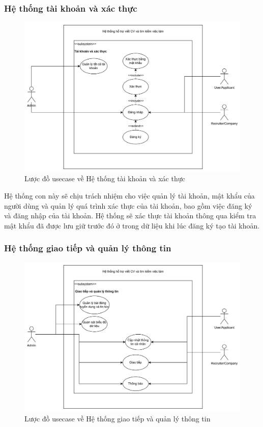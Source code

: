 \subsubsection{Hệ thống tài khoản và xác thực}

\begin{figure}[H]
	\centering
    \includegraphics[scale=0.1]{img/AccountAuthenticationUsecase.png}
    \caption{Lược đồ usecase về Hệ thống tài khoản và xác thực}
\end{figure}

Hệ thống con này sẽ chịu trách nhiệm cho việc quản lý tài khoản, mật khẩu của người dùng và quản lý quá trình xác thực của tài khoản, bao gồm việc đăng ký và đăng nhập của tài khoản. Hệ thống sẽ xác thực tài khoản thông qua kiểm tra mật khẩu đã được lưu giữ trước đó ở trong dữ liệu khi lúc đăng ký tạo tài khoản.


\subsubsection{Hệ thống giao tiếp và quản lý thông tin}

\begin{figure}[H]
	\centering
    \includegraphics[scale=0.1]{img/communicateInfomationUsecase.png}
    \caption{Lược đồ usecase về Hệ thống giao tiếp và quản lý thông tin}
\end{figure}

